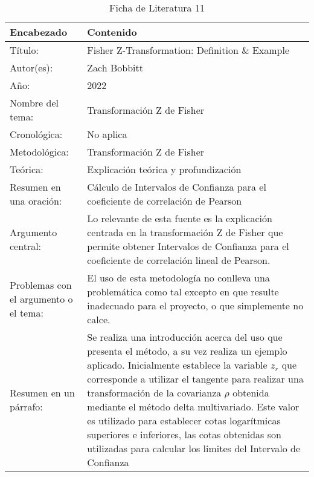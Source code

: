 \begin{table}[H]
    \caption{Ficha de Literatura 11}
    \begin{center}
        \begin{tabular}{  m{3cm} | m{12cm}  }
        \hline
        \textbf{ Encabezado} & \textbf{Contenido }\\ 
        \hline
        Título: & Fisher Z-Transformation: Definition \& Example \\ 
        \hline
        Autor(es): & Zach Bobbitt \\
        \hline
        Año: & 2022 \\ 
        \hline
        Nombre del tema: & Transformación Z de Fisher \\ 
        \hline
        Cronológica: & No aplica  \\ 
        \hline
        Metodológica: & Transformación Z de Fisher \\  
        \hline
        Teórica: & Explicación teórica y profundización \\ 
        \hline
        Resumen en una oración: & Cálculo de Intervalos de Confianza para el coeficiente de correlación de Pearson \\ 
        \hline
        Argumento central: & Lo relevante de esta fuente es la explicación centrada en la transformación Z de Fisher que permite obtener Intervalos de Confianza para el coeficiente de correlación lineal de Pearson. \\ 
        \hline
        Problemas con el argumento o el tema: & El uso de esta metodología no conlleva una problemática como tal excepto en que resulte inadecuado para el proyecto, o que simplemente no calce.  \\ 
        \hline
        Resumen en un párrafo: & Se realiza una introducción acerca del uso que presenta el método, a su vez realiza un ejemplo aplicado. Inicialmente establece la variable $z_r$ que corresponde a utilizar el tangente para realizar una transformación de la covarianza $\rho$ obtenida mediante el método delta multivariado. Este valor es utilizado para establecer cotas logarítmicas superiores e inferiores, las cotas obtenidas son utilizadas para calcular los limites del Intervalo de Confianza 
        \\ 
        \hline
        \end{tabular}
    \end{center}
\end{table}
